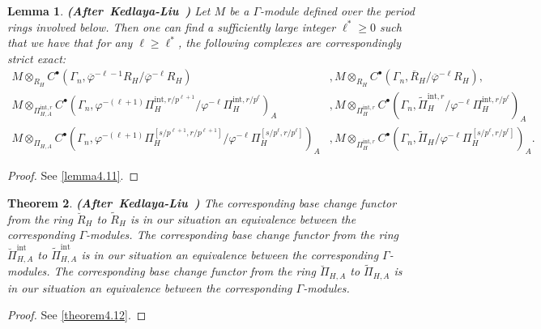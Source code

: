 \documentclass[12pt]{amsart}
\newtheorem{theorem}{Theorem}[section]
\newtheorem{lemma}[theorem]{Lemma}
\theoremstyle{definition}
\numberwithin{equation}{section}
\begin{document}
\begin{lemma} \mbox{\bf{(After Kedlaya-Liu \cite[Lemma 5.6.6]{KL16})}} 
Let $M$ be a $\Gamma$-module defined over the period rings involved below. Then one can find a sufficiently large integer $\ell^*\geq 0$ such that we have that for any $\ell\geq \ell^*$, the following complexes are correspondingly strict exact: 
\begin{align}
M\otimes_{R_H} C^\bullet(\Gamma_n,\overline{\varphi}^{-\ell-1}R_H/\overline{\varphi}^{-\ell}R_H)&, M\otimes_{R_H} C^\bullet(\Gamma_n,\overline{R}_H/\overline{\varphi}^{-\ell}R_H),\\
M\otimes_{\Pi^{\mathrm{int},r}_{H,A}} C^\bullet(\Gamma_n,\varphi^{-(\ell+1)}\Pi^{\mathrm{int},r/p^{\ell+1}}_{H}/\varphi^{-\ell}\Pi^{\mathrm{int},r/p^\ell}_{H})_A&, M\otimes_{\Pi^{\mathrm{int},r}_{H}} C^\bullet(\Gamma_n,\widetilde{\Pi}^{\mathrm{int},r}_{H}/\varphi^{-\ell}\Pi^{\mathrm{int},r/p^\ell}_{H})_A\\ 
M\otimes_{\Pi_{H,A}} C^\bullet(\Gamma_n,\varphi^{-(\ell+1)}\Pi^{[s/p^{\ell+1},r/p^{\ell+1}]}_{H}/\varphi^{-\ell}\Pi^{[s/p^{\ell},r/p^{\ell}]}_{H})_A&, M\otimes_{\Pi^{\mathrm{int},r}_{H}} C^\bullet(\Gamma_n,\widetilde{\Pi}_{H}/\varphi^{-\ell}\Pi^{[s/p^{\ell},r/p^{\ell}]}_{H})_A.
\end{align}	
	



\end{lemma}
	


\begin{proof}
See \cref{lemma4.11}.	
\end{proof}




\begin{theorem}\mbox{\bf{(After Kedlaya-Liu \cite[Lemma 5.6.9]{KL16})}} 
The corresponding base change functor from the ring $\breve{R}_H$ to $\widetilde{R}_H$ is in our situation an equivalence between the corresponding $\Gamma$-modules.	 The corresponding base change functor from the ring $\breve{\Pi}^{\mathrm{int}}_{H,A}$ to $\widetilde{\Pi}^\mathrm{int}_{H,A}$ is in our situation an equivalence between the corresponding $\Gamma$-modules. The corresponding base change functor from the ring $\breve{\Pi}_{H,A}$ to $\widetilde{\Pi}_{H,A}$ is in our situation an equivalence between the corresponding $\Gamma$-modules.
\end{theorem}


\begin{proof}
See \cref{theorem4.12}.
\end{proof}
\end{document}
